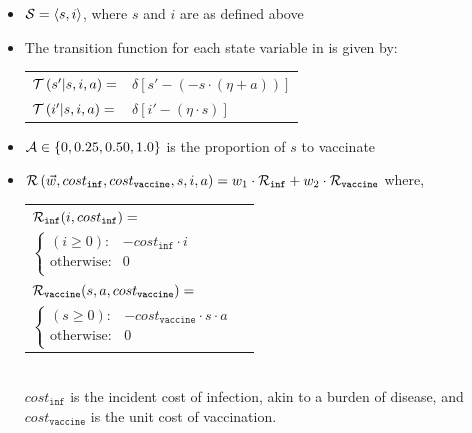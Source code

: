 \begin{itemize}
    \item {\footnotesize $ \mathcal{S} = \left\langle s, i \right\rangle$}, where $ s $ and $ i $ are as defined above
    \item The transition function {\footnotesize \Transition} for each state variable in {\footnotesize \State} is given by:    \\
    {\footnotesize 
        \abovedisplayskip=5pt
        \belowdisplayskip=0pt
        \renewcommand{\arraystretch}{1.5}
        \begin{tabular}{ll}
            $ \mathcal{T}\left( s' | s, i, a \right) =$ & $ \delta \left[ s' - (- s \cdot (\eta + a)) \right] $ \\
            $ \mathcal{T}\left( i' | s, i, a \right) =$ & $ \delta \left[ i' - (\eta \cdot s) \right] $ \\
        \end{tabular}
    }%
    \item {\footnotesize $ \mathcal{A} \in \left\lbrace 0, 0.25, 0.50, 1.0 \right\rbrace $} is the proportion of $ s $ to vaccinate 
    \item {\footnotesize $ \mathcal{R}\left(\vec{w}, cost_{\mathtt{inf}}, cost_{\mathtt{vaccine}}, s, i, a \right) = w_1 \cdot \mathcal{R}_{\mathtt{inf}} + w_2 \cdot \mathcal{R}_{\mathtt{vaccine}}$} where, \\
    {\footnotesize 
        \abovedisplayskip=10pt
        \belowdisplayskip=0pt
        \renewcommand{\arraystretch}{1.5}
        \begin{tabular}{ll}    
            $ \mathcal{R}_{\mathtt{inf}}(i, cost_{\mathtt{inf}}) = $ &  $ $ \\
            \qquad $ \begin{cases}
            (i \geq 0) : & -cost_{\mathtt{inf}} \cdot i \\
            \text{otherwise} : & 0 \\
            \end{cases} $ & $ $ \\
            $ \mathcal{R}_{\mathtt{vaccine}}(s, a, cost_{\mathtt{vaccine}}) = $ &  $ $ \\
            \qquad $ \begin{cases}
            (s \geq 0) : & -cost_{\mathtt{vaccine}} \cdot s \cdot a \\
            \text{otherwise} : & 0 \\
            \end{cases} $ & $ $ \\
        \end{tabular}
    } \\
    {\footnotesize $ cost_{\mathtt{inf}} $} is the incident cost of infection, akin to a burden of disease, and {\footnotesize $ cost_{\mathtt{vaccine}} $} is the unit cost of vaccination.
\end{itemize} 

